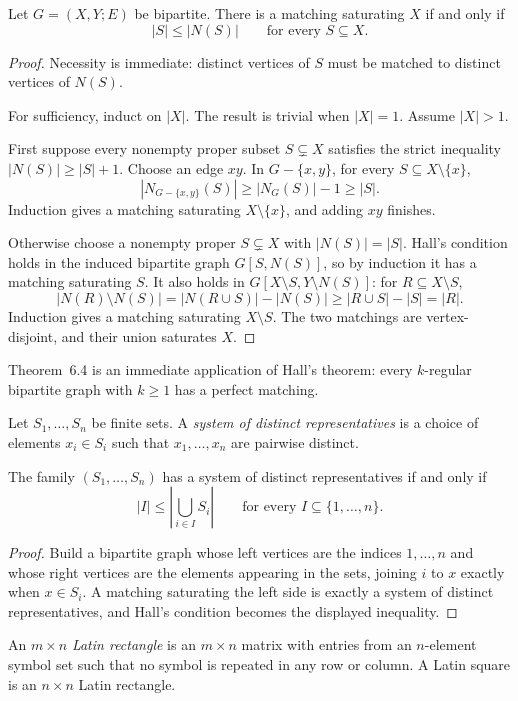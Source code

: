 \begin{notetheorem}
Let $G=(X,Y;E)$ be bipartite.  There is a matching saturating $X$ if and only
if
\[
  |S|\le|N(S)|\qquad\text{for every }S\subseteq X.
\]
\end{notetheorem}
\begin{proof}
Necessity is immediate: distinct vertices of $S$ must be matched to distinct
vertices of $N(S)$.

For sufficiency, induct on $|X|$.  The result is trivial when $|X|=1$.
Assume $|X|>1$.

First suppose every nonempty proper subset $S\subsetneq X$ satisfies the
strict inequality $|N(S)|\ge|S|+1$.  Choose an edge $xy$.  In
$G-\{x,y\}$, for every $S\subseteq X\setminus\{x\}$,
\[
  |N_{G-\{x,y\}}(S)|\ge |N_G(S)|-1\ge |S|.
\]
Induction gives a matching saturating $X\setminus\{x\}$, and adding $xy$
finishes.

Otherwise choose a nonempty proper $S\subsetneq X$ with $|N(S)|=|S|$.
Hall's condition holds in the induced bipartite graph $G[S,N(S)]$, so by
induction it has a matching saturating $S$.  It also holds in
$G[X\setminus S,Y\setminus N(S)]$: for $R\subseteq X\setminus S$,
\[
  |N(R)\setminus N(S)|
  =|N(R\cup S)|-|N(S)|
  \ge |R\cup S|-|S|=|R|.
\]
Induction gives a matching saturating $X\setminus S$.  The two matchings are
vertex-disjoint, and their union saturates $X$.
\end{proof}
\begin{noteapplication}
Theorem~6.4 is an immediate application of Hall's theorem: every
$k$-regular bipartite graph with $k\ge1$ has a perfect matching.
\end{noteapplication}

\begin{notedefinition}
Let $S_1,\dots,S_n$ be finite sets.  A \emph{system of distinct
representatives} is a choice of elements $x_i\in S_i$ such that
$x_1,\dots,x_n$ are pairwise distinct.
\end{notedefinition}

\begin{notetheorem}
The family $(S_1,\dots,S_n)$ has a system of distinct representatives if and
only if
\[
  |I|\le\left|\bigcup_{i\in I}S_i\right|
  \qquad\text{for every }I\subseteq\{1,\dots,n\}.
\]
\end{notetheorem}
\begin{proof}
Build a bipartite graph whose left vertices are the indices $1,\dots,n$ and
whose right vertices are the elements appearing in the sets, joining $i$ to
$x$ exactly when $x\in S_i$.  A matching saturating the left side is exactly
a system of distinct representatives, and Hall's condition becomes the
displayed inequality.
\end{proof}
\begin{notedefinition}
An $m\times n$ \emph{Latin rectangle} is an $m\times n$ matrix with entries
from an $n$-element symbol set such that no symbol is repeated in any row or
column.  A Latin square is an $n\times n$ Latin rectangle.
\end{notedefinition}

